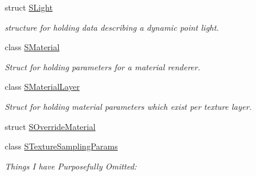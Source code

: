 \begin{DoxyCompactItemize}
struct \hyperlink{structirr_1_1video_1_1SLight}{S\+Light}
\begin{DoxyCompactList}\small\item\em structure for holding data describing a dynamic point light. \end{DoxyCompactList}\item 
class \hyperlink{classirr_1_1video_1_1SMaterial}{S\+Material}
\begin{DoxyCompactList}\small\item\em Struct for holding parameters for a material renderer. \end{DoxyCompactList}\item 
class \hyperlink{classirr_1_1video_1_1SMaterialLayer}{S\+Material\+Layer}
\begin{DoxyCompactList}\small\item\em Struct for holding material parameters which exist per texture layer. \end{DoxyCompactList}\item 
struct \hyperlink{structirr_1_1video_1_1SOverrideMaterial}{S\+Override\+Material}
\item 
class \hyperlink{classirr_1_1video_1_1STextureSamplingParams}{S\+Texture\+Sampling\+Params}
\begin{DoxyCompactList}\small\item\em Things I have Purposefully Omitted\+: \end{DoxyCompactList}\end{DoxyCompactItemize}

